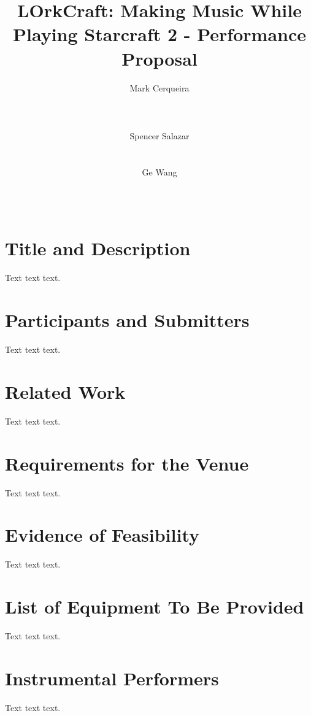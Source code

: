 \documentclass{nime-document-class}
\begin{document}

\newcommand{\projectName}{LOrkCraft}

\title{\projectName{}: Making Music While Playing Starcraft 2 - Performance Proposal}

\author{
\alignauthor
Mark Cerqueira\\
       \\
       \\
       \\
\alignauthor
Spencer Salazar\\
       \\
       \\
\alignauthor
Ge Wang\\
       \\
       \\
}

\maketitle

\section{Title and Description}
Text text text.

\section{Participants and Submitters}
Text text text.

\section{Related Work}
Text text text.

\section{Requirements for the Venue}
Text text text.

\section{Evidence of Feasibility}
Text text text.

\section{List of Equipment To Be Provided}
Text text text.

\section{Instrumental Performers}
Text text text.

\end{document}
